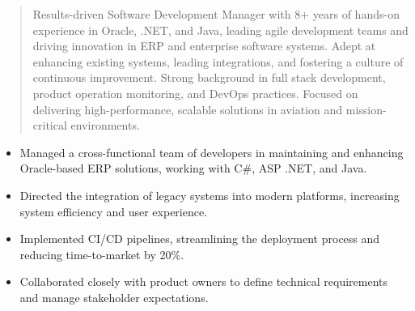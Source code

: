 



\makecvheader

\begin{quote}
  \noindent
  Results-driven Software Development Manager with 8+ years of hands-on experience in Oracle, .NET, and Java, leading agile development teams and driving innovation in ERP and enterprise software systems. Adept at enhancing existing systems, leading integrations, and fostering a culture of continuous improvement. Strong background in full stack development, product operation monitoring, and DevOps practices. Focused on delivering high-performance, scalable solutions in aviation and mission-critical environments.
\end{quote}

\par\smallskip
\noindent
\begin{minipage}{20cm}
  \begin{minipage}{9.75cm}
    \begin{itemize}
      \item Managed a cross-functional team of developers in maintaining and enhancing Oracle-based ERP solutions, working with C#, ASP .NET, and Java.
      \item Directed the integration of legacy systems into modern platforms, increasing system efficiency and user experience.
    \end{itemize}
  \end{minipage}
  \hfill
  \begin{minipage}{9.75cm}
    \begin{itemize}
      \item Implemented CI/CD pipelines, streamlining the deployment process and reducing time-to-market by 20\%.
      \item Collaborated closely with product owners to define technical requirements and manage stakeholder expectations.
    \end{itemize}
  \end{minipage}
\end{minipage}
\par\smallskip
\divider

